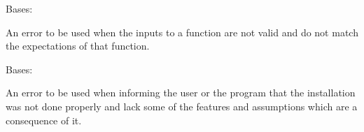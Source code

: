 \documentclass[letterpaper,11pt,english]{sphinxmanual}
\begin{document}
\begin{savenotes}\begin{fulllineitems}
\label{\detokenize{code/opihiexarata.library.error:opihiexarata.library.error.InputError}}
\pysigstartsignatures
{}
\pysigstopsignatures
\sphinxAtStartPar
Bases: {\hyperref[\detokenize{code/opihiexarata.library.error:opihiexarata.library.error.ExarataException}]{}}

\sphinxAtStartPar
An error to be used when the inputs to a function are not valid and do
not match the expectations of that function.

\end{fulllineitems}\end{savenotes}


\begin{savenotes}\begin{fulllineitems}
\label{\detokenize{code/opihiexarata.library.error:opihiexarata.library.error.InstallError}}
\pysigstartsignatures
{}
\pysigstopsignatures
\sphinxAtStartPar
Bases: {\hyperref[\detokenize{code/opihiexarata.library.error:opihiexarata.library.error.ExarataException}]{}}

\sphinxAtStartPar
An error to be used when informing the user or the program that the
installation was not done properly and lack some of the features and
assumptions which are a consequence of it.

\end{fulllineitems}\end{savenotes}

\end{document}
